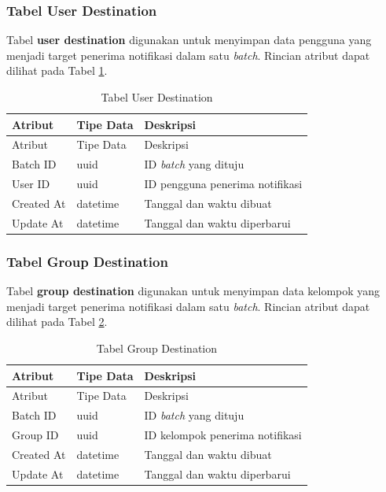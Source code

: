 \subsubsection{Tabel User Destination}
\par Tabel \textbf{user destination} digunakan untuk menyimpan data pengguna yang menjadi target penerima notifikasi dalam satu \textit{batch}. Rincian atribut dapat dilihat pada Tabel \ref{tabel_user_destination}.
\begin{longtable}{|p{2cm}|p{2.5cm}|p{4.5cm}|}
	\caption{Tabel User Destination} \label{tabel_user_destination} \\ \hline
    \rowcolor{lightgray} {Atribut} & {Tipe Data} & {Deskripsi} \\ \hline
    \endfirsthead
    \hline
    \rowcolor{lightgray} {Atribut} & {Tipe Data} & {Deskripsi} \\ \hline
    \endhead
    Batch ID & uuid & ID \textit{batch} yang dituju \\ \hline
    User ID & uuid & ID pengguna penerima notifikasi \\ \hline
    Created At & datetime & Tanggal dan waktu dibuat \\ \hline
    Update At & datetime & Tanggal dan waktu diperbarui \\ \hline
\end{longtable}

\subsubsection{Tabel Group Destination}
\par Tabel \textbf{group destination} digunakan untuk menyimpan data kelompok yang menjadi target penerima notifikasi dalam satu \textit{batch}. Rincian atribut dapat dilihat pada Tabel \ref{tabel_group_destination}.
\begin{longtable}{|p{2cm}|p{2.5cm}|p{4.5cm}|}
	\caption{Tabel Group Destination} \label{tabel_group_destination} \\ \hline
    \rowcolor{lightgray} {Atribut} & {Tipe Data} & {Deskripsi} \\ \hline
    \endfirsthead
    \hline
    \rowcolor{lightgray} {Atribut} & {Tipe Data} & {Deskripsi} \\ \hline
    \endhead
    Batch ID & uuid & ID \textit{batch} yang dituju \\ \hline
    Group ID & uuid & ID kelompok penerima notifikasi \\ \hline
    Created At & datetime & Tanggal dan waktu dibuat \\ \hline
    Update At & datetime & Tanggal dan waktu diperbarui \\ \hline
\end{longtable}

